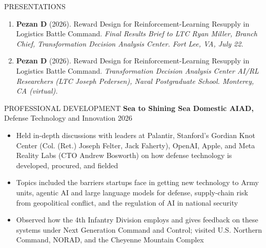\documentclass{resume}
\begin{document}
\begin{rSection}{PRESENTATIONS}
\begin{enumerate}[leftmargin=*]
\item \textbf{Pezan D} (2026). Reward Design for Reinforcement-Learning Resupply in Logistics Battle Command.{ \it{Final Results Brief to LTC Ryan Miller, Branch Chief, Transformation Decision Analysis Center}. \textnormal{Fort Lee, VA, July 22.}}
\item \textbf{Pezan D} (2026). Reward Design for Reinforcement-Learning Resupply in Logistics Battle Command.{ \it{Transformation Decision Analysis Center AI/RL Researchers (LTC Joseph Pedersen), Naval Postgraduate School}. \textnormal{Monterey, CA (virtual).}}
\end{enumerate}
\end{rSection}

\begin{rSection}{PROFESSIONAL DEVELOPMENT} \itemsep -3pt
\textbf{Sea to Shining Sea Domestic AIAD,} Defense Technology and Innovation \hfill{2026}
\vspace{-5pt}
\begin{itemize}
\setlength\itemsep{-1.5ex}
    \item Held in-depth discussions with leaders at Palantir, Stanford's Gordian Knot Center (Col. (Ret.) Joseph Felter, Jack Faherty), OpenAI, Apple, and Meta Reality Labs (CTO Andrew Bosworth) on how defense technology is developed, procured, and fielded
    \item Topics included the barriers startups face in getting new technology to Army units, agentic AI and large language models for defense, supply-chain risk from geopolitical conflict, and the regulation of AI in national security
    \item Observed how the 4th Infantry Division employs and gives feedback on these systems under Next Generation Command and Control; visited U.S. Northern Command, NORAD, and the Cheyenne Mountain Complex
\end{itemize}
\end{rSection}
\end{document}
